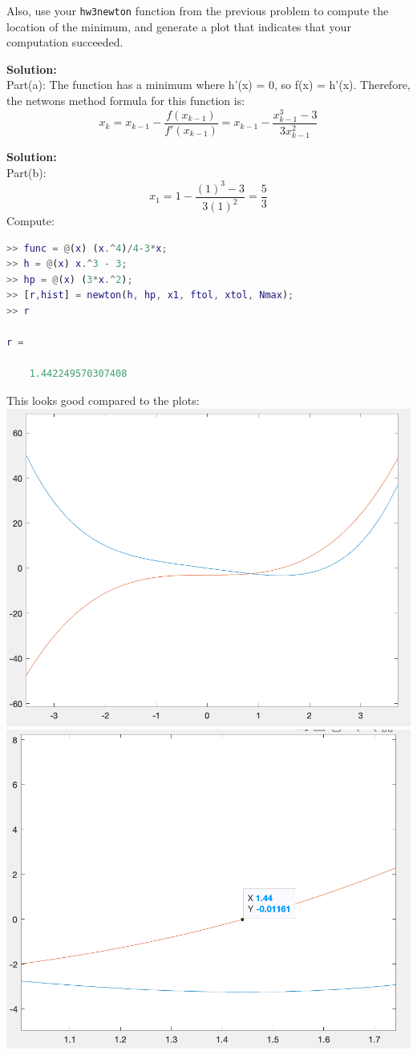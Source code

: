 \documentclass[12pt]{article}
\makeatletter
\theoremstyle{homework}
\newenvironment{exercise}[1]
{\def\@currentlabel{#1}\exercisecore}
{\endexercisecore}
\newcommand{\localhead}[1]{\par\smallskip\noindent\textbf{#1}\nobreak\\}%
\newcommand\solution{\localhead{Solution:}}
\makeatother
\begin{document}
\begin{exercise}{Chapter 4: 6 (a,b)}
Also, use your \texttt{hw3newton} function from the previous problem
to compute the location of the minimum, and generate a plot that indicates that your computation succeeded.
\end{exercise}
\solution 
Part(a):
The function has a minimum where h'(x) = 0, so f(x) = h'(x). Therefore, the netwons method formula
for this function is:
\begin{equation}
x_{k} = x_{k-1} - \frac{f(x_{k-1})}{f'(x_{k-1})} = x_{k-1} - \frac{x_{k-1}^3-3}{3x_{k-1}^2}
\end{equation}
\solution
Part(b): 
\begin{equation}
x_{1} = 1 - \frac{(1)^3-3}{3(1)^2} = \frac{5}{3}
\end{equation}
Compute:
\begin{lstlisting}[language=Matlab]
>> func = @(x) (x.^4)/4-3*x;
>> h = @(x) x.^3 - 3;
>> hp = @(x) (3*x.^2);
>> [r,hist] = newton(h, hp, x1, ftol, xtol, Nmax);
>> r

r =

    1.442249570307408
\end{lstlisting}
This looks good compared to the plots:
\newline
\includegraphics[scale=0.5]{original.png}
\includegraphics[scale=0.5]{zoomed.png}
\end{document}
